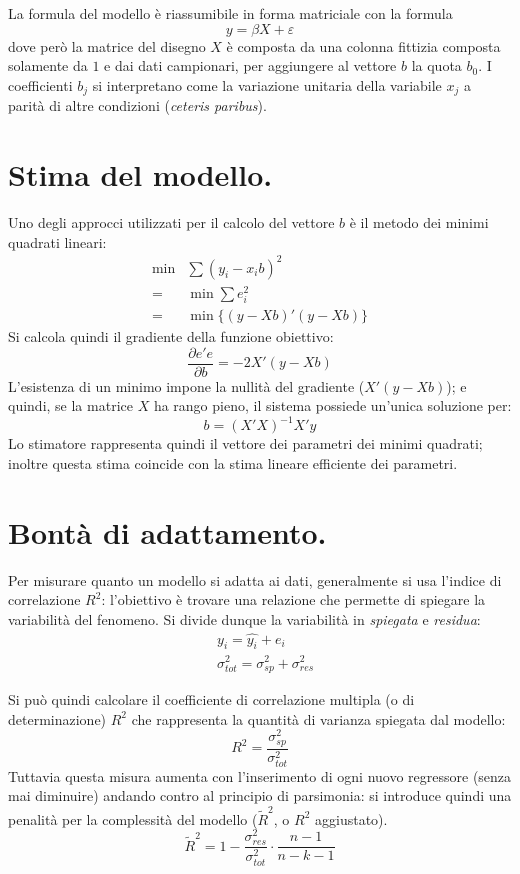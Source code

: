 \documentclass[11pt]{article}
\begin{document}
La formula del modello è riassumibile in forma matriciale con la formula
\begin{equation*}
  y = \beta X + \varepsilon
\end{equation*}
dove però la matrice del disegno $X$ è composta da una colonna fittizia composta solamente da $1$ e dai dati campionari, per aggiungere al vettore $b$ la quota $b_0$.
I coefficienti $b_j$ si interpretano come la variazione unitaria della variabile $x_j$ a parità di altre condizioni (\textit{ceteris paribus}).

\section{Stima del modello.}
Uno degli approcci utilizzati per il calcolo del vettore $b$ è il metodo dei minimi quadrati lineari:
\begin{align*}
  \min & \sum{(y_i - x_i b)^2} \\
  =& \min \sum{e_i^2} \\
  =& \min \{ (y -X b)'(y - X b) \}
\end{align*}
Si calcola quindi il gradiente della funzione obiettivo:
\begin{equation*}
  \frac{\partial{e'e}}{\partial{b}} = -2 X'(y - X b)
\end{equation*}
L'esistenza di un minimo impone la nullità del gradiente ($X'(y - X b)$); e quindi, se la matrice $X$ ha rango pieno, il sistema possiede un'unica soluzione per:
\begin{equation*}
  b = (X'X)^{-1}X'y
\end{equation*}
Lo stimatore rappresenta quindi il vettore dei parametri dei minimi quadrati; inoltre questa stima coincide con la stima lineare efficiente dei parametri.

\section{Bontà di adattamento.}
Per misurare quanto un modello si adatta ai dati, generalmente si usa l'indice di correlazione $R^2$: l'obiettivo è trovare una relazione che permette di spiegare la variabilità del fenomeno.
Si divide dunque la variabilità in \textit{spiegata} e \textit{residua}:
\begin{align*}
  &y_i = \hat{y_i} + e_i \\
  &\sigma^2_{tot} = \sigma^2_{sp} + \sigma^2_{res}
\end{align*}

Si può quindi calcolare il coefficiente di correlazione multipla (o di determinazione) $R^2$ che rappresenta la quantità di varianza spiegata dal modello:
\begin{equation*}
  R^2 = \frac{\sigma^2_{sp}}{\sigma^2_{tot}}
\end{equation*}
Tuttavia questa misura aumenta con l'inserimento di ogni nuovo regressore (senza mai diminuire) andando contro al principio di parsimonia: si introduce quindi una penalità per la complessità del modello ($\tilde{R}^2$, o $R^2$ aggiustato).
\begin{equation*}
  \tilde{R}^2 = 1 - \frac{\sigma^2_{res}}{\sigma^2_{tot}} \cdot \frac{n-1}{n-k-1}
\end{equation*}
\end{document}
